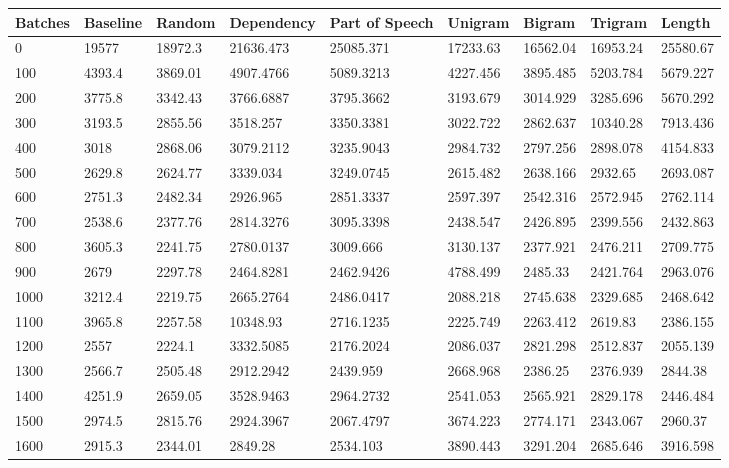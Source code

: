 \documentclass [11pt, proquest] {uwthesis}[2020/12/20]
\begin{document}
\begin{table}
\begin{tiny}
\centering
\begin{tabular}{|l|l|l|l|l|l|l|l|l|}
\hline
Batches & Baseline & Random & Dependency & Part of Speech & Unigram & Bigram & Trigram & Length \\ \hline
0 & 19577 & 18972.3 & 21636.473 & 25085.371 & 17233.63 & 16562.04 & 16953.24 & 25580.67 \\ \hline
100 & 4393.4 & 3869.01 & 4907.4766 & 5089.3213 & 4227.456 & 3895.485 & 5203.784 & 5679.227 \\ \hline
200 & 3775.8 & 3342.43 & 3766.6887 & 3795.3662 & 3193.679 & 3014.929 & 3285.696 & 5670.292 \\ \hline
300 & 3193.5 & 2855.56 & 3518.257 & 3350.3381 & 3022.722 & 2862.637 & 10340.28 & 7913.436 \\ \hline
400 & 3018 & 2868.06 & 3079.2112 & 3235.9043 & 2984.732 & 2797.256 & 2898.078 & 4154.833 \\ \hline
500 & 2629.8 & 2624.77 & 3339.034 & 3249.0745 & 2615.482 & 2638.166 & 2932.65 & 2693.087 \\ \hline
600 & 2751.3 & 2482.34 & 2926.965 & 2851.3337 & 2597.397 & 2542.316 & 2572.945 & 2762.114 \\ \hline
700 & 2538.6 & 2377.76 & 2814.3276 & 3095.3398 & 2438.547 & 2426.895 & 2399.556 & 2432.863 \\ \hline
800 & 3605.3 & 2241.75 & 2780.0137 & 3009.666 & 3130.137 & 2377.921 & 2476.211 & 2709.775 \\ \hline
900 & 2679 & 2297.78 & 2464.8281 & 2462.9426 & 4788.499 & 2485.33 & 2421.764 & 2963.076 \\ \hline
1000 & 3212.4 & 2219.75 & 2665.2764 & 2486.0417 & 2088.218 & 2745.638 & 2329.685 & 2468.642 \\ \hline
1100 & 3965.8 & 2257.58 & 10348.93 & 2716.1235 & 2225.749 & 2263.412 & 2619.83 & 2386.155 \\ \hline
1200 & 2557 & 2224.1 & 3332.5085 & 2176.2024 & 2086.037 & 2821.298 & 2512.837 & 2055.139 \\ \hline
1300 & 2566.7 & 2505.48 & 2912.2942 & 2439.959 & 2668.968 & 2386.25 & 2376.939 & 2844.38 \\ \hline
1400 & 4251.9 & 2659.05 & 3528.9463 & 2964.2732 & 2541.053 & 2565.921 & 2829.178 & 2446.484 \\ \hline
1500 & 2974.5 & 2815.76 & 2924.3967 & 2067.4797 & 3674.223 & 2774.171 & 2343.067 & 2960.37 \\ \hline
1600 & 2915.3 & 2344.01 & 2849.28 & 2534.103 & 3890.443 & 3291.204 & 2685.646 & 3916.598 \\ \hline

\end{tabular}
\end{tiny}
\end{table}
\end{document}
